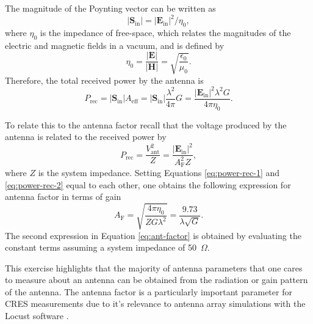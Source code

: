 The magnitude of the Poynting vector can be written as
\begin{equation}
    |\mathbf{S}_\mathrm{in}|=|\mathbf{E}_\mathrm{in}|^2/\eta_0,
\end{equation}
where $\eta_0$ is the impedance of free-space, which relates the magnitudes of the electric and magnetic fields in a vacuum, and is defined by
\begin{equation}
    \eta_0 = \frac{|\mathbf{E}|}{|\mathbf{H}|} = \sqrt{\frac{\epsilon_0}{\mu_0}}.
\end{equation}
Therefore, the total received power by the antenna is
\begin{equation}
    P_\mathrm{rec}=|\mathbf{S}_\mathrm{in}|A_\mathrm{eff}=|\mathbf{S}_\mathrm{in}|\frac{\lambda^2}{4\pi}G=\frac{|\mathbf{E}_\mathrm{in}|^2\lambda^2G}{4\pi\eta_0}.
    \label{eq:power-rec-1}
\end{equation}

To relate this to the antenna factor recall that the voltage produced by the antenna is related to the received power by
\begin{equation}
    P_\mathrm{rec}=\frac{V_\mathrm{ant}^2}{Z}=\frac{|\mathbf{E}_\mathrm{in}|^2}{A_\mathrm{F}^2Z},
    \label{eq:power-rec-2}
\end{equation}
where $Z$ is the system impedance. Setting Equations \ref{eq:power-rec-1} and \ref{eq:power-rec-2} equal to each other, one obtains the following expression for antenna factor in terms of gain
\begin{equation}
    A_\mathrm{F} = \sqrt{\frac{4\pi\eta_0}{ZG\lambda^2}}=\frac{9.73}{\lambda\sqrt{G}}.
    \label{eq:ant-factor}
\end{equation}
The second expression in Equation \ref{eq:ant-factor} is obtained by evaluating the constant terms assuming a system impedance of 50~$\Omega$.

This exercise highlights that the majority of antenna parameters that one cares to measure about an antenna can be obtained from the radiation or gain pattern of the antenna. The antenna factor is a particularly important parameter for CRES measurements due to it's relevance to antenna array simulations with the Locust software \cite{p8locustpaper, nb_thesis}. %

